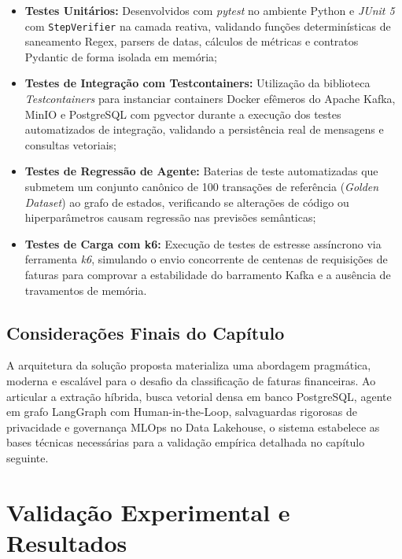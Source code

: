 \documentclass[
	12pt,				
	openright,			
	oneside,			
	a4paper,			
	english,			
	brazil				
	]{abntex2}
\begin{document}
\begin{itemize}
    \item \textbf{Testes Unitários:} Desenvolvidos com \textit{pytest} no ambiente Python e \textit{JUnit 5} com \texttt{StepVerifier} na camada reativa, validando funções determinísticas de saneamento Regex, parsers de datas, cálculos de métricas e contratos Pydantic de forma isolada em memória;
    \item \textbf{Testes de Integração com Testcontainers:} Utilização da biblioteca \textit{Testcontainers} para instanciar containers Docker efêmeros do Apache Kafka, MinIO e PostgreSQL com pgvector durante a execução dos testes automatizados de integração, validando a persistência real de mensagens e consultas vetoriais;
    \item \textbf{Testes de Regressão de Agente:} Baterias de teste automatizadas que submetem um conjunto canônico de 100 transações de referência (\textit{Golden Dataset}) ao grafo de estados, verificando se alterações de código ou hiperparâmetros causam regressão nas previsões semânticas;
    \item \textbf{Testes de Carga com k6:} Execução de testes de estresse assíncrono via ferramenta \textit{k6}, simulando o envio concorrente de centenas de requisições de faturas para comprovar a estabilidade do barramento Kafka e a ausência de travamentos de memória.
\end{itemize}

\section{Considerações Finais do Capítulo}
\label{sec:sol_consideracoes_finais}

A arquitetura da solução proposta materializa uma abordagem pragmática, moderna e escalável para o desafio da classificação de faturas financeiras. Ao articular a extração híbrida, busca vetorial densa em banco PostgreSQL, agente em grafo LangGraph com Human-in-the-Loop, salvaguardas rigorosas de privacidade e governança MLOps no Data Lakehouse, o sistema estabelece as bases técnicas necessárias para a validação empírica detalhada no capítulo seguinte.

\chapter{Validação Experimental e Resultados}
\label{chp:validacao}
\end{document}
